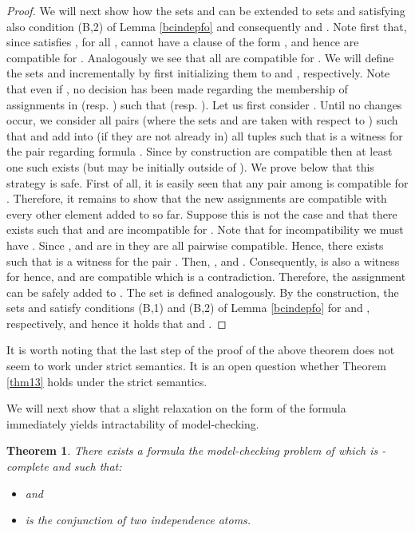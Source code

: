 \documentclass{article}
\theoremstyle{plain}
\newtheorem{theorem}{Theorem}
\theoremstyle{definition}
\begin{document}
\begin{proof}
We will next show how the  sets  and  can be extended to sets  and  satisfying also condition (B,2) of Lemma   \ref{bcindepfo} and consequently  and  .
 Note first that, since  satisfies , for all ,  cannot have a clause of the form , and hence  are compatible for . Analogously we see that all   are compatible for  .
We will define the sets   and  incrementally by first initializing them to   and , respectively. Note that even if , no decision has been made regarding the membership of   assignments  in  (resp. ) such that  (resp. ).  Let us first consider . Until no changes occur,  we consider all pairs  (where the sets  and  are taken with respect to ) such that    and add into  (if they are not already in) all tuples  such that  is a witness for the pair  regarding formula . Since by construction  are compatible then at least one such   exists (but may be initially outside of ). We prove below that this strategy is safe.
First of all, it is  easily seen that any pair among  is compatible for . Therefore, it remains to show that the new assignments   are compatible with every other element  added to  so far. Suppose this is not the case and that there exists  such that  and  are incompatible for . Note that  for incompatibility we  must have . Since , and  are in  they are all pairwise compatible. Hence, there exists  such that  is a witness for the pair .
Then,  , and  . Consequently,  is also a witness for  hence,  and  are compatible which is a contradiction. Therefore,  the assignment   can be safely added to . The set   is defined analogously. By the construction,  the sets  and  satisfy conditions (B,1) and (B,2) of Lemma   \ref{bcindepfo} for  and , respectively,  and hence it holds that    and  .
  
 




\end{proof}


It is worth noting that the last step of the proof of the above theorem does not seem to  work  under strict semantics. It is an open question whether Theorem \ref{thm13} holds under the strict semantics.

We will next show that a slight relaxation on the form of the formula immediately yields intractability 
of model-checking.
\begin{theorem}
There exists a formula  the model-checking problem of which is -complete and such that:

\begin{itemize}
    \item  and
    \item  is the conjunction of \textit{two} independence atoms.
\end{itemize} 
\end{theorem}
\end{document}
